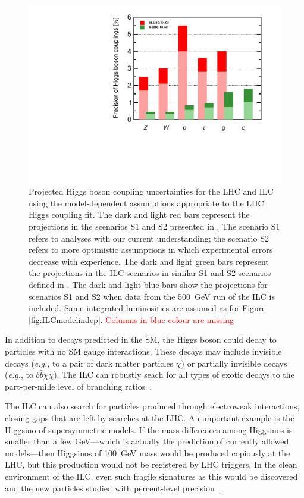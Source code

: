 \documentclass[%
 reprint,
 amsmath,amssymb,
 aps,
]{revtex4-1}
\newcommand{\todo}[1]{\textcolor{red}{{#1}}}
\def\eg{{\it e.g.}}
\begin{document}
\begin{figure}
\begin{center}
\includegraphics[width=0.70\hsize]{figures/ModeldepSummary.pdf}
\caption{Projected Higgs boson coupling uncertainties for the LHC and
  ILC
using the model-dependent assumptions appropriate to the LHC Higgs
coupling fit.   The
dark and light red bars represent the projections in the scenarios S1
and S2 presented in  \cite{Yellow}.  The scenario S1 refers to
analyses with our current understanding; the scenario S2 refers to
more optimistic assumptions in which experimental errors decrease with
experience.  The dark and light green bars represent the
projections in the ILC scenarios in similar S1 and S2 scenarios defined in
\cite{ILCforESS}. 
 The dark and light blue bars show the projections for scenarios S1 and S2
when
data from the 500~GeV run of the ILC is included. Same integrated luminosities are assumed as for Figure \ref{fig:ILCmodelindep}. \todo{Columns in blue colour are missing}}
 \label{fig:ILCLHC}
\end{center}
\end{figure}

In addition to decays predicted in the SM, the Higgs boson could decay
to particles with no SM gauge interactions.    These decays may
include invisible decays (\eg, to a pair of dark matter particles $\chi$)  or
partially invisible decays (\eg, to $b\bar b \chi \chi$).   The ILC
can robustly seach for all types of exotic decays  to the 
part-per-mille level of branching ratios~\cite{Liu:2016zki}.

The ILC can also search for particles produced through electroweak
interactions, closing gaps that are left by searches at the LHC.  An
important example is the Higgsino of supersymmetric models.   If the
mass  differences among Higgsinos is smaller than a few GeV---which is
actually the prediction of currently allowed models---then Higgsinos
of 100~GeV mass would be produced copiously at the LHC, but this
production would not be registered by LHC triggers.  In the clean
environment 
of the ILC, even such fragile signatures as this 
would be discovered and the new particles 
studied with percent-level precision~\cite{Higgsino}.
\end{document}
